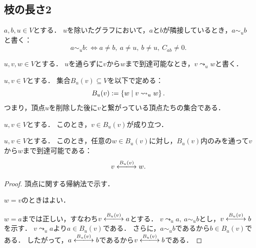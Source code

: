 \subsection{枝の長さ2}

\begin{definition}
  \label{def:adjExcl}
  \leanok
  \uses{}
  $a, b, u \in V$とする．
  $u$を除いたグラフにおいて，$a$と$b$が隣接しているとき，$a \sim_u b$と書く：
  \begin{equation}
    a \sim_u b
    :\iff a \ne b,\ a \ne u,\ b \ne u,\ C_{ab} \ne 0.
  \end{equation}
\end{definition}

\begin{definition}
  \label{def:reachExcl}
  \leanok
  \uses{}
  $u, v, w \in V$とする．
  $u$を通らずに$v$から$w$まで到達可能なとき，$v \leadsto_u w$と書く．
\end{definition}

\begin{definition}
  \label{def:branchSet}
  \leanok
  $u, v \in V$とする．
  集合$B_u(v) \subseteq V$を以下で定める：
  \begin{equation}
    B_u(v) := \left\lbrace w \mathrel{} \middle| \mathrel{} v \leadsto_u w \right\rbrace.
  \end{equation}
  つまり，頂点$u$を削除した後に$v$と繋がっている頂点たちの集合である．
\end{definition}

\begin{lemma}
  \label{lem:branchFinset_refl}
  \leanok
  \uses{}
  $u, v \in V$とする．
  このとき，$v \in B_u(v)$が成り立つ．
\end{lemma}

\begin{lemma}
  \label{lem:branch_connected}
  \leanok
  \uses{}
  $u, v \in V$とする．
  このとき，任意の$w \in B_u(v)$に対し，$B_u(v)$内のみを通って$v$から$w$まで到達可能である：
  \begin{equation}
    v \reach{B_u(v)} w.
  \end{equation}
\end{lemma}

\begin{proof}
  頂点に関する帰納法で示す．

  $w = v$のときはよい．

  $w = a$までは正しい，すなわち$v \reach{B_u(v)} a$とする．
  $v \leadsto_u a,\ a \sim_u b$とし，$v \reach{B_u(v)} b$を示す．
  $v \leadsto_u a$より$a \in B_u(v)$である．
  さらに，$a \sim_u b$であるから$b \in B_u(v)$である．
  したがって，$a \reach{B_u(v)} b$であるから$v \reach{B_u(v)} b$である．
\end{proof}

